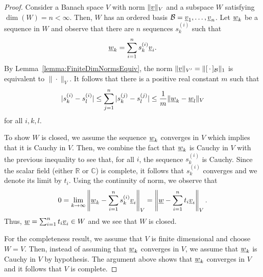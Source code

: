 \begin{proof}
Consider a Banach space $V$ with norm $\| \underline{v} \|_V$ and a subspace $W$ satisfying $\dim(W) = n < \infty$.
Then, $W$ has an ordered  basis $\mathcal{B} = \underline{v}_1,\ldots,\underline{v}_n$.
Let $\underline{w}_k$ be a sequence in $W$ and observe that there are $n$ sequences $s^{(i)}_k$ such that
\[ \underline{w}_k = \sum_{i=1}^n s^{(i)}_k \underline{v}_i. \]
By Lemma~\ref{lemma:FiniteDimNormsEquiv}, the norm $\| \underline{v} \|_{V'} = \| [ \, \cdot \,]_\mathcal{B} \|_1$ is equivalent to $\| \cdot \|_V$.
It follows that there is a positive real constant $m$ such that
\[ | s^{(i)}_k - s^{(i)}_l | \leq \sum_{j=1}^n | s^{(j)}_k - s^{(j)}_l | \leq \frac{1}{m} \| \underline{w}_k - \underline{w}_l \|_V \]
for all $i,k,l$.

To show $W$ is closed, we assume the sequence $\underline{w}_k$ converges in $V$ which implies that it is Cauchy in $V$.
Then, we combine the fact that $\underline{w}_k$ is Cauchy in $V$ with the previous inequality to see that, for all $i$, the sequence $s^{(i)}_k$ is Cauchy.
Since the scalar field (either $\mathbb{R}$ or $\mathbb{C}$) is complete, it follows that $s^{(i)}_k$ converges and we denote its limit by $t_i$.
Using the continuity of norm, we observe that
\[ 0 = \lim_{k\to \infty} \left\| \underline{w}_k - \sum_{i=1}^n s_k^{(i)} \underline{v}_i \right\|_V = \left\| \underline{w} - \sum_{i=1}^n t_i \underline{v}_i \right\|_V . \]
Thus, $\underline{w} = \sum_{i=1}^n t_i \underline{v}_i \in W$ and we see that $W$ is closed.

For the completeness result, we assume that $V$ is finite dimensional and choose $W=V$.
Then, instead of assuming that $\underline{w}_k$ converges in $V$, we assume that $\underline{w}_k$ is Cauchy in $V$ by hypothesis.
The argument above shows that $\underline{w}_k$ converges in $V$ and it follows that $V$ is complete.

\end{proof}

